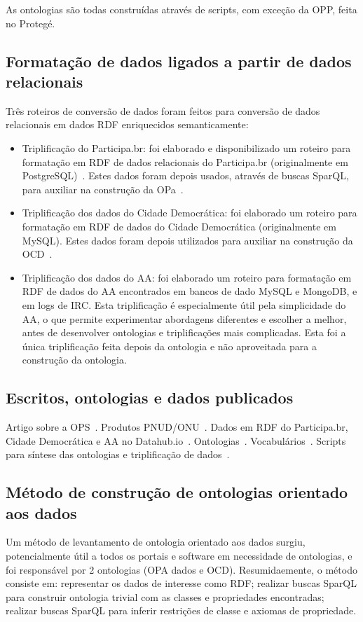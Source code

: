 \documentclass[a4paper,openright,12pt]{report} %
\begin{document}
As ontologias são todas construídas através de scripts, com exceção da
OPP, feita no Protegé.

\subsection{Formatação de dados ligados a partir de dados relacionais}
Três roteiros de conversão de dados foram feitos para conversão de dados relacionais em dados RDF enriquecidos semanticamente:
\begin{itemize}
	\item Triplificação do Participa.br: 
		foi elaborado e disponibilizado um roteiro para formatação em RDF de dados relacionais do Participa.br (originalmente em PostgreSQL)~\cite{triplificaParticipa}. Estes dados foram depois usados, através de buscas SparQL, para auxiliar na construção da OPa~\cite{opaScript}.
	\item Triplificação dos dados do Cidade Democrática: 
		foi elaborado um roteiro para formatação em RDF de dados 
		do Cidade Democrática (originalmente em MySQL). Estes
		dados foram depois utilizados para auxiliar na construção
		da OCD~\cite{ocdScript}.
	\item Triplificação dos dados do AA:
		foi elaborado um roteiro para formatação em RDF de
		dados do AA encontrados em bancos de dado MySQL
		e MongoDB, e em logs de IRC.
		Esta triplificação é especialmente útil pela
		simplicidade do AA, o que permite experimentar
		abordagens diferentes e escolher a melhor, antes
		de desenvolver ontologias e triplificações mais complicadas.
		Esta foi a única triplificação feita depois da ontologia e não aproveitada para a construção da ontologia.
\end{itemize}

\subsection{Escritos, ontologias e dados publicados}
Artigo sobre a OPS~\cite{ops}. Produtos PNUD/ONU~\cite{pnud3,pnud4,pnud5}.
Dados em RDF do Participa.br, Cidade
Democrática e AA no Datahub.io~\cite{datahub}.
Ontologias~\cite{opa,opp,ops,obs}. Vocabulários~\cite{vbs}.
Scripts para síntese das ontologias e triplificação
de dados~\cite{opa,ops,obs,partT,cdT,aaT}.

\subsection{Método de construção de ontologias orientado aos dados}
Um método de levantamento de ontologia orientado aos dados surgiu, potencialmente útil a todos os portais e software em necessidade de ontologias, e foi responsável por 2 ontologias (OPA dados e OCD).
Resumidaemente, o método consiste em: representar os dados de interesse como RDF; realizar buscas SparQL para construir ontologia trivial com as classes e propriedades encontradas; realizar buscas SparQL para inferir restrições de classe e axiomas de propriedade.
\end{document}
